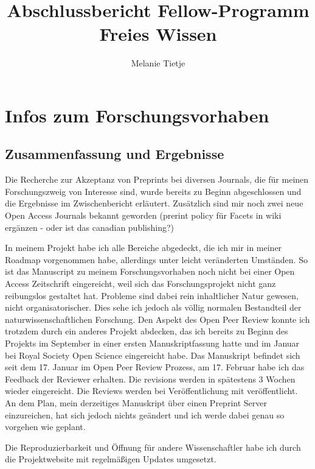 \documentclass[11pt,a4paper]{article}
\begin{document}
\title{Abschlussbericht Fellow-Programm Freies Wissen}
\author{Melanie Tietje}
\maketitle


\section{Infos zum Forschungsvorhaben}%
\subsection{Zusammenfassung und Ergebnisse} %
Die Recherche zur Akzeptanz von Preprints bei diversen Journals, die für meinen Forschungszweig von Interesse sind, wurde bereits zu Beginn abgeschlossen und die Ergebnisse im Zwischenbericht erläutert. Zusätzlich sind mir noch zwei neue Open Access Journals bekannt geworden (prerint policy für Facets in wiki ergänzen - oder ist das canadian publishing?)

In meinem Projekt habe ich alle Bereiche abgedeckt, die ich mir in meiner Roadmap vorgenommen habe, allerdings unter leicht veränderten Umständen. So ist das Manuscript zu meinem Forschungsvorhaben noch nicht bei einer Open Access Zeitschrift eingereicht, weil sich das Forschungsprojekt nicht ganz reibungslos gestaltet hat. Probleme sind dabei rein inhaltlicher Natur gewesen, nicht organisatorischer. Dies sehe ich jedoch als völlig normalen Bestandteil der naturwissenschaftlichen Forschung. Den Aspekt des Open Peer Review konnte ich trotzdem durch ein anderes Projekt abdecken, das ich bereits zu Beginn des Projekts im September in einer ersten Manuskriptfassung hatte und im Januar bei Royal Society Open Science eingereicht habe. Das Manuskript befindet sich seit dem 17. Januar im Open Peer Review Prozess, am 17. Februar habe ich das Feedback der Reviewer erhalten. Die revisions werden in spätestens 3 Wochen wieder eingereicht. Die Reviews werden bei Veröffentlichung mit veröffentlicht. An dem Plan, mein derzeitiges Manuskript über einen Preprint Server einzureichen, hat sich jedoch nichts geändert und ich werde dabei genau so vorgehen wie geplant.

Die Reproduzierbarkeit und Öffnung für andere Wissenschaftler habe ich durch die Projektwebsite mit regelmäßigen Updates umgesetzt.
\end{document}
